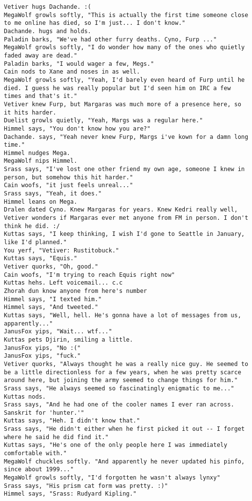 \begin{verbatim}
Vetiver hugs Dachande. :(
MegaWolf growls softly, "This is actually the first time someone close to me online has died, so I'm just... I don't know."
Dachande. hugs and holds.
Paladin barks, "We've had other furry deaths. Cyno, Furp ..."
MegaWolf growls softly, "I do wonder how many of the ones who quietly faded away are dead."
Paladin barks, "I would wager a few, Megs."
Cain nods to Xane and noses in as well.
MegaWolf growls softly, "Yeah, I'd barely even heard of Furp until he died. I guess he was really popular but I'd seen him on IRC a few times and that's it."
Vetiver knew Furp, but Margaras was much more of a presence here, so it hits harder.
Duelist growls quietly, "Yeah, Margs was a regular here."
Himmel says, "You don't know how you are?"
Dachande. says, "Yeah never knew Furp, Margs i've kown for a damn long time."
Himmel nudges Mega.
MegaWolf nips Himmel.
Srass says, "I've lost one other friend my own age, someone I knew in person, but somehow this hit harder."
Cain woofs, "it just feels unreal..."
Srass says, "Yeah, it does."
Himmel leans on Mega.
Dralen dated Cyno. Knew Margaras for years. Knew Kedri really well,
Vetiver wonders if Margaras ever met anyone from FM in person. I don't think he did. :/
Kuttas says, "I keep thinking, I wish I'd gone to Seattle in January, like I'd planned."
You yerf, "Vetiver: Rustitobuck."
Kuttas says, "Equis."
Vetiver quorks, "Oh, good."
Cain woofs, "I'm trying to reach Equis right now"
Kuttas hehs. Left voicemail... c.c
Zhorah dun know anyone from here's number
Himmel says, "I texted him."
Himmel says, "And tweeted."
Kuttas says, "Well, hell. He's gonna have a lot of messages from us, apparently..."
JanusFox yips, "Wait... wtf..."
Kuttas pets Djirin, smiling a little.
JanusFox yips, "No :("
JanusFox yips, "fuck."
Vetiver quorks, "Always thought he was a really nice guy. He seemed to be a little directionless for a few years, when he was pretty scarce around here, but joining the army seemed to change things for him."
Srass says, "He always seemed so fascinatingly enigmatic to me..."
Kuttas nods.
Srass says, "And he had one of the cooler names I ever ran across.  Sanskrit for 'hunter.'"
Kuttas says, "Heh. I didn't know that."
Srass says, "He didn't either when he first picked it out -- I forget where he said he did find it."
Kuttas says, "He's one of the only people here I was immediately comfortable with."
MegaWolf chuckles softly. "And apparently he never updated his pinfo, since about 1999..."
MegaWolf growls softly, "I'd forgotten he wasn't always lynxy"
Srass says, "His prism cat form was pretty. :)"
Himmel says, "Srass: Rudyard Kipling."

\end{verbatim}
